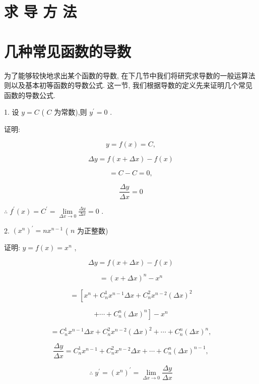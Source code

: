 \documentclass[lang=cn,newtx,10pt,scheme=chinese]{elegantbook}
\begin{document}
\section*{求 导 方 法}

\section{几种常见函数的导数}

为了能够较快地求出某个函数的导数, 在下几节中我们将研究求导数的一般运算法则以及基本初等函数的导数公式. 这一节, 我们根据导数的定义先来证明几个常见函数的导数公式.
\begin{conclusion}
	1. 设 \(y = C\) ( \(C\) 为常数),则 \({y}^{\prime } = 0\) .
\end{conclusion}

证明:

\[
y = f\left( x\right) = C,
\]

\[
{\Delta y} = f\left( {x + {\Delta x}}\right) - f\left( x\right)
\]

\[
= C - C = 0,
\]

\[
\frac{\Delta y}{\Delta x} = 0
\]

\(\therefore \;{f}^{\prime }\left( x\right) = {C}^{\prime } = \mathop{\lim }\limits_{{{\Delta x} \rightarrow 0}}\frac{\Delta y}{\Delta x} = 0\) .

\begin{conclusion}
	2. \({\left( {x}^{n}\right) }^{\prime } = n{x}^{n - 1}\) ( \(n\) 为正整数)
\end{conclusion}

证明: \(y = f\left( x\right) = {x}^{n}\) ,

\[
{\Delta y} = f\left( {x + {\Delta x}}\right) - f\left( x\right)
\]

\[
= {\left( x + \Delta x\right) }^{n} - {x}^{n}
\]

\[
= \left\lbrack {{x}^{n} + {C}_{n}^{1}{x}^{n - 1}{\Delta x} + {C}_{n}^{2}{x}^{n - 2}{\left( \Delta x\right) }^{2}}\right.
\]

\[
\left. {+\cdots + {C}_{n}^{n}{\left( \Delta x\right) }^{n}}\right\rbrack - {x}^{n}
\]

\[
= {C}_{n}^{1}{x}^{n - 1}{\Delta x} + {C}_{n}^{2}{x}^{n - 2}{\left( \Delta x\right) }^{2} + \cdots + {C}_{n}^{n}{\left( \Delta x\right) }^{n},
\]

\[
\frac{\Delta y}{\Delta x} = {C}_{n}^{1}{x}^{n - 1} + {C}_{n}^{2}{x}^{n - 2}{\Delta x} + \cdots + {C}_{n}^{n}{\left( \Delta x\right) }^{n - 1},
\]

\[
\therefore \;{y}^{\prime } = {\left( {x}^{n}\right) }^{\prime } = \mathop{\lim }\limits_{{{\Delta x} \rightarrow 0}}\frac{\Delta y}{\Delta x}
\]
\end{document}
